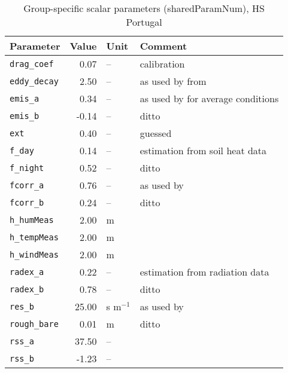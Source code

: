 \begin{table}[ht]
\centering
\caption{Group-specific scalar parameters (\textsf{sharedParamNum}), HS Portugal} 
\label{tab:portugalHS_sharedParamNum}
\begin{tabular}{lrll}
  \hline
Parameter & Value & Unit & Comment \\ 
  \hline
\verb!drag_coef! & 0.07 & -- & calibration \\ 
  \verb!eddy_decay! & 2.50 & -- & as used by \citet{shuttleworth85} from \citet{monteith73} \\ 
  \verb!emis_a! & 0.34 & -- & as used by \citet{maidment93} for average conditions \\ 
  \verb!emis_b! & -0.14 & -- & ditto \\ 
  \verb!ext! & 0.40 & -- & guessed \\ 
  \verb!f_day! & 0.14 & -- & estimation from soil heat data \\ 
  \verb!f_night! & 0.52 & -- & ditto \\ 
  \verb!fcorr_a! & 0.76 & -- & as used by \citet{maidment93} \\ 
  \verb!fcorr_b! & 0.24 & -- & ditto \\ 
  \verb!h_humMeas! & 2.00 & m &  \\ 
  \verb!h_tempMeas! & 2.00 & m &  \\ 
  \verb!h_windMeas! & 2.00 & m &  \\ 
  \verb!radex_a! & 0.22 & -- & estimation from radiation data \\ 
  \verb!radex_b! & 0.78 & -- & ditto \\ 
  \verb!res_b! & 25.00 & s m$^{-1}$ & as used by \citet{shuttleworth85} \\ 
  \verb!rough_bare! & 0.01 & m & ditto \\ 
  \verb!rss_a! & 37.50 & -- &  \\ 
  \verb!rss_b! & -1.23 & -- &  \\ 
   \hline
\end{tabular}
\end{table}
